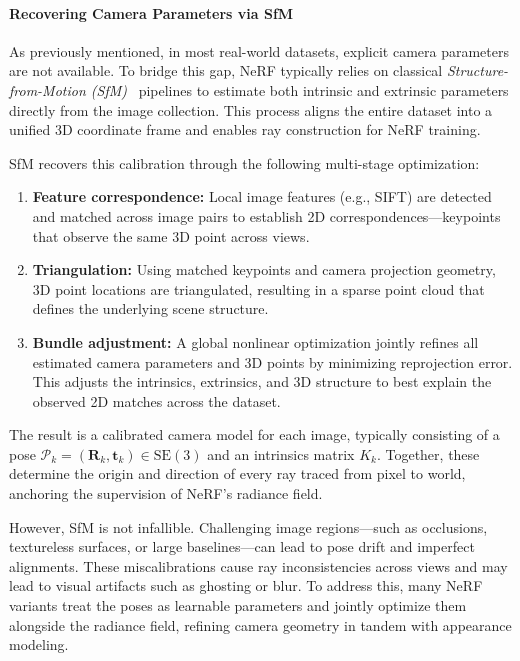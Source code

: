 \paragraph{Recovering Camera Parameters via SfM}
As previously mentioned, in most real-world datasets, explicit camera parameters are not available. To bridge this gap, NeRF typically relies on classical \emph{Structure-from-Motion (SfM)}~\cite{schonberger2016_structure} pipelines to estimate both intrinsic and extrinsic parameters directly from the image collection. This process aligns the entire dataset into a unified 3D coordinate frame and enables ray construction for NeRF training.

SfM recovers this calibration through the following multi-stage optimization:

\begin{enumerate}
    \item \textbf{Feature correspondence:} Local image features (e.g., SIFT) are detected and matched across image pairs to establish 2D correspondences—keypoints that observe the same 3D point across views.
    
    \item \textbf{Triangulation:} Using matched keypoints and camera projection geometry, 3D point locations are triangulated, resulting in a sparse point cloud that defines the underlying scene structure.
    
    \item \textbf{Bundle adjustment:} A global nonlinear optimization jointly refines all estimated camera parameters and 3D points by minimizing reprojection error. This adjusts the intrinsics, extrinsics, and 3D structure to best explain the observed 2D matches across the dataset.
\end{enumerate}

The result is a calibrated camera model for each image, typically consisting of a pose \( \mathcal{P}_k = (\mathbf{R}_k, \mathbf{t}_k) \in \mathrm{SE}(3) \) and an intrinsics matrix \( K_k \). Together, these determine the origin and direction of every ray traced from pixel to world, anchoring the supervision of NeRF's radiance field.

However, SfM is not infallible. Challenging image regions—such as occlusions, textureless surfaces, or large baselines—can lead to pose drift and imperfect alignments. These miscalibrations cause ray inconsistencies across views and may lead to visual artifacts such as ghosting or blur. To address this, many NeRF variants treat the poses as learnable parameters and jointly optimize them alongside the radiance field, refining camera geometry in tandem with appearance modeling.

